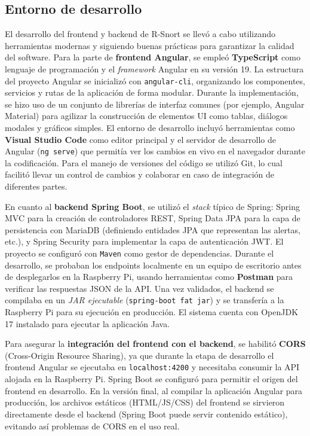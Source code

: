 \documentclass[11pt,a4paper,twoside]{report}
\begin{document}
\subsection{Entorno de desarrollo}
El desarrollo del frontend y backend de R-Snort se llevó a cabo utilizando herramientas modernas y siguiendo buenas prácticas para garantizar la calidad del software. Para la parte de \textbf{frontend Angular}, se empleó \textbf{TypeScript} como lenguaje de programación y el \emph{framework} Angular en su versión 19. La estructura del proyecto Angular se inicializó con \texttt{angular-cli}, organizando los componentes, servicios y rutas de la aplicación de forma modular. Durante la implementación, se hizo uso de un conjunto de librerías de interfaz comunes (por ejemplo, Angular Material) para agilizar la construcción de elementos UI como tablas, diálogos modales y gráficos simples. El entorno de desarrollo incluyó herramientas como \textbf{Visual Studio Code} como editor principal y el servidor de desarrollo de Angular (\texttt{ng serve}) que permitía ver los cambios en vivo en el navegador durante la codificación. Para el manejo de versiones del código se utilizó Git, lo cual facilitó llevar un control de cambios y colaborar en caso de integración de diferentes partes.\newline

En cuanto al \textbf{backend Spring Boot}, se utilizó el \emph{stack} típico de Spring: Spring MVC para la creación de controladores REST, Spring Data JPA para la capa de persistencia con MariaDB (definiendo entidades JPA que representan las alertas, etc.), y Spring Security para implementar la capa de autenticación JWT. El proyecto se configuró con \texttt{Maven} como gestor de dependencias. Durante el desarrollo, se probaban los endpoints localmente en un equipo de escritorio antes de desplegarlos en la Raspberry Pi, usando herramientas como \textbf{Postman} para verificar las respuestas JSON de la API. Una vez validados, el backend se compilaba en un \emph{JAR ejecutable} (\texttt{spring-boot fat jar}) y se transfería a la Raspberry Pi para su ejecución en producción. El sistema cuenta con OpenJDK 17 instalado para ejecutar la aplicación Java.\newline

Para asegurar la \textbf{integración del frontend con el backend}, se habilitó \textbf{CORS} (Cross-Origin Resource Sharing), ya que durante la etapa de desarrollo el frontend Angular se ejecutaba en \texttt{localhost:4200} y necesitaba consumir la API alojada en la Raspberry Pi. Spring Boot se configuró para permitir el origen del frontend en desarrollo. En la versión final, al compilar la aplicación Angular para producción, los archivos estáticos (HTML/JS/CSS) del frontend se sirvieron directamente desde el backend (Spring Boot puede servir contenido estático), evitando así problemas de CORS en el uso real.\newline
\end{document}
